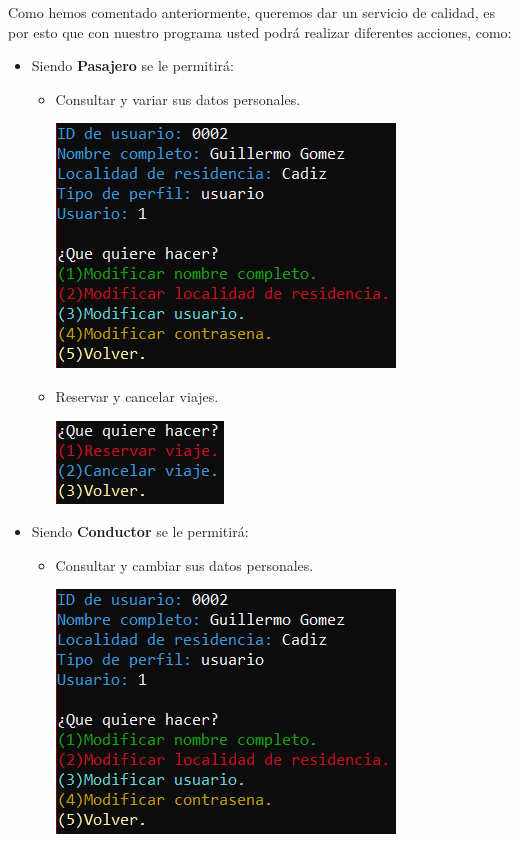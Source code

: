 Como hemos comentado anteriormente, queremos dar un servicio de calidad, es por esto que con nuestro programa usted podrá realizar diferentes acciones, como:
\begin{itemize}
  \item Siendo \textbf{Pasajero} se le permitirá:
  \begin{itemize}
    \item Consultar y variar sus datos personales.
    \begin{center}
    \includegraphics[]{FOTOS/menuPasajeroPerfil.png}
    \end{center}
    \item Reservar y cancelar viajes.
    \begin{center}
    \includegraphics[]{FOTOS/menuPasajeroViaje.png}
    \end{center}
  \end{itemize}
  \item Siendo \textbf{Conductor} se le permitirá:
  \begin{itemize}
    \item Consultar y cambiar sus datos personales.
    \begin{center}
    \includegraphics[]{FOTOS/menuPasajeroPerfil.png}

\end{center}
\end{itemize}
\end{itemize}
